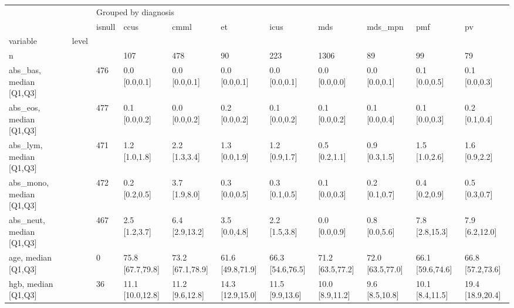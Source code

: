 \begin{tabular}{lllllllllll}
\toprule
                 &    & \multicolumn{9}{l}{Grouped by diagnosis} \\
                 &    &               isnull &                ccus &               cmml &                   et &                icus &               mds &           mds\_mpn &                 pmf &                   pv \\
variable & level &                      &                     &                    &                      &                     &                   &                   &                     &                      \\
\midrule
n &    &                      &                 107 &                478 &                   90 &                 223 &              1306 &                89 &                  99 &                   79 \\
abs\_bas, median [Q1,Q3] &    &                  476 &       0.0 [0.0,0.1] &      0.0 [0.0,0.1] &        0.0 [0.0,0.1] &       0.0 [0.0,0.1] &     0.0 [0.0,0.0] &     0.0 [0.0,0.1] &       0.1 [0.0,0.5] &        0.1 [0.0,0.3] \\
abs\_eos, median [Q1,Q3] &    &                  477 &       0.1 [0.0,0.2] &      0.0 [0.0,0.2] &        0.2 [0.0,0.2] &       0.1 [0.0,0.2] &     0.1 [0.0,0.2] &     0.1 [0.0,0.4] &       0.1 [0.0,0.3] &        0.2 [0.1,0.4] \\
abs\_lym, median [Q1,Q3] &    &                  471 &       1.2 [1.0,1.8] &      2.2 [1.3,3.4] &        1.3 [0.0,1.9] &       1.2 [0.9,1.7] &     0.5 [0.2,1.1] &     0.9 [0.3,1.5] &       1.5 [1.0,2.6] &        1.6 [0.9,2.2] \\
abs\_mono, median [Q1,Q3] &    &                  472 &       0.2 [0.2,0.5] &      3.7 [1.9,8.0] &        0.3 [0.0,0.5] &       0.3 [0.1,0.5] &     0.1 [0.0,0.3] &     0.2 [0.1,0.7] &       0.4 [0.2,0.9] &        0.5 [0.3,0.7] \\
abs\_neut, median [Q1,Q3] &    &                  467 &       2.5 [1.2,3.7] &     6.4 [2.9,13.2] &        3.5 [0.0,4.8] &       2.2 [1.5,3.8] &     0.0 [0.0,0.9] &     0.8 [0.0,5.6] &      7.8 [2.8,15.3] &       7.9 [6.2,12.0] \\
age, median [Q1,Q3] &    &                    0 &    75.8 [67.7,79.8] &   73.2 [67.1,78.9] &     61.6 [49.8,71.9] &    66.3 [54.6,76.5] &  71.2 [63.5,77.2] &  72.0 [63.5,77.0] &    66.1 [59.6,74.6] &     66.8 [57.2,73.6] \\
hgb, median [Q1,Q3] &    &                   36 &    11.1 [10.0,12.8] &    11.2 [9.6,12.8] &     14.3 [12.9,15.0] &     11.5 [9.9,13.6] &   10.0 [8.9,11.2] &    9.6 [8.5,10.8] &     10.1 [8.4,11.5] &     19.4 [18.9,20.4] \\

\end{tabular}

